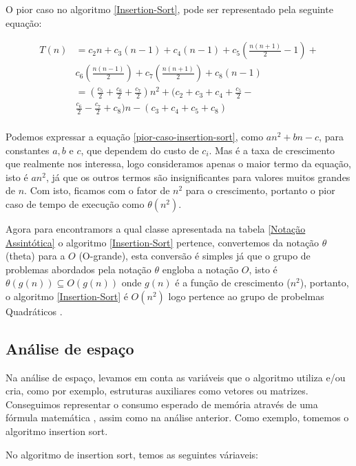 \documentclass[
	12pt,				%
	openright,			%
	oneside,			%
	a4paper,			%
	english,			%
	brazil				%
	]{abntex2}
\begin{document}
O pior caso no algoritmo \ref{Insertion-Sort}, pode ser representado pela seguinte equação:

\begin{equation}
	\label{pior-caso-insertion-sort}
	\begin{split}
		T(n)& = c_2n + c_3(n - 1) + c_4(n - 1) + c_5(\frac{n(n+1)}{2}-1) + \\
			&   c_6(\frac{n(n-1)}{2}) + c_7(\frac{n(n+1)}{2}) + c_8(n-1) \\
			& = (\frac{c_5}{2} + \frac{c_6}{2} + \frac{c_7}{2})n^2 + (c_2 + c_3 + c_4 + \frac{c_5}{2} - \\
			&   \frac{c_6}{2} - \frac{c_7}{2} + c_8)n - (c_3 + c_4 + c_5 + c_8) \\
	\end{split}
\end{equation}

Podemos expressar a equação \ref{pior-caso-insertion-sort}, como $an^2 + bn - c$, para constantes $a, b$ e $c$, que dependem do custo de
$c_i$. Mas é a taxa de crescimento que realmente nos interessa, logo consideramos apenas o maior termo da equação, isto é $an^2$, já que
os outros termos são insignificantes para valores muitos grandes de $n$. Com isto, ficamos com o fator de $n^2$ para o crescimento, portanto
o pior caso de tempo de execução como $\theta(n^2)$.

Agora para encontramors a qual classe apresentada na tabela \ref{Notação Assintótica} o algoritmo \ref{Insertion-Sort} pertence, convertemos
da notação $\theta$ (theta) para a $O$ (O-grande), esta conversão é simples já que o grupo de problemas abordados pela notação $\theta$ engloba
a notação $O$, isto é $\theta(g(n)) \subseteq O(g(n))$ onde $g(n)$ é a função de crescimento ($n^2$), portanto, o algoritmo \ref{Insertion-Sort}
é $O(n^2)$ logo pertence ao grupo de probelmas Quadráticos \cite{introductionAlgorthms}.

\subsection{Análise de espaço}

Na análise de espaço, levamos em conta as variáveis que o algoritmo utiliza e/ou cria, como por exemplo, estruturas auxiliares como vetores ou 
matrizes. Conseguimos representar o consumo esperado de memória através de uma fórmula matemática \cite{introductionAnalysis}, assim como na 
análise anterior. Como exemplo, tomemos o algoritmo insertion sort.

No algoritmo de insertion sort, temos as seguintes váriaveis:
\end{document}
